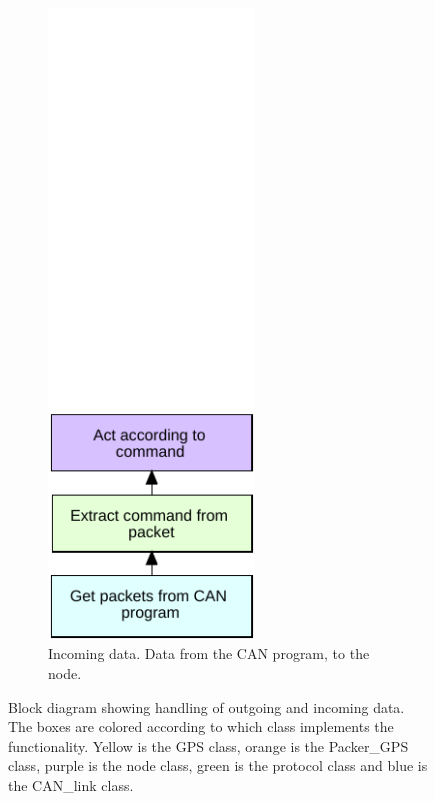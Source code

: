 \begin{figure}[!h]
\begin{subfigure}{0.45\textwidth}
\includegraphics[width=0.60\textwidth]{graphics/FlowChart_Node_Unpacking}
\caption{Incoming data. Data from the CAN program, to the node.}
\label{fig:filter_2}
\end{subfigure}
\caption[Block diagram showing handling of outgoing and incoming data.]{Block diagram showing handling of outgoing and incoming data. The boxes are colored according to which class implements the functionality. 
Yellow is the GPS class, orange is the Packer\_GPS class, purple is the node class, green is the protocol class and blue is the CAN\_link class.}
\label{fig:flow_flow}
\end{figure}

